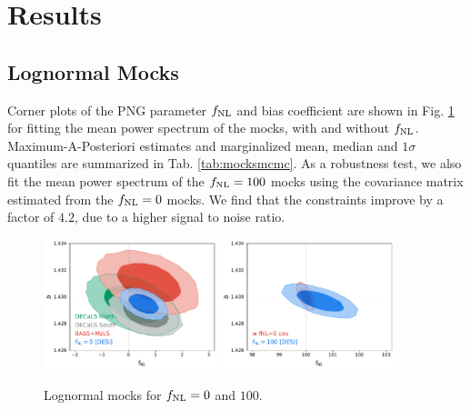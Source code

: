\section{Results}\label{sec:results}


\subsection{Lognormal Mocks}

Corner plots of the PNG parameter $f_{\rm NL}$ and bias coefficient are shown in Fig. \ref{fig:mcmc_mocks} for fitting the mean power spectrum of the mocks, with and without $f_{\rm NL}$. Maximum-A-Posteriori estimates and marginalized mean, median and $1\sigma$ quantiles are summarized in Tab. \ref{tab:mocksmcmc}. As a robustness test, we also fit the mean power spectrum of the $f_{\rm NL}=100$ mocks using the covariance matrix estimated from the $f_{\rm NL}=0$ mocks. We find that the constraints improve by a factor of $4.2$, due to a higher signal to noise ratio.
\begin{figure}
    \centering
    \includegraphics[width=0.45\textwidth]{figures/mcmc_zero.pdf} 
    \includegraphics[width=0.45\textwidth]{figures/mcmc_po100.pdf} 
    \caption{Lognormal mocks for $f_{\rm NL}=0$ and $100$.}\label{fig:mcmc_mocks}
\end{figure}


